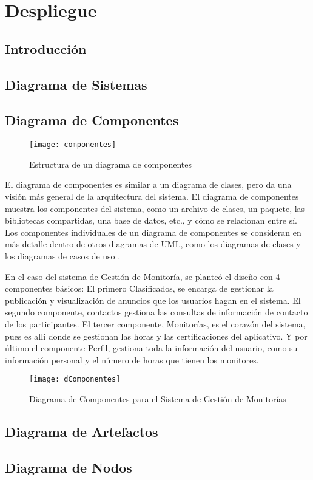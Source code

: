 \chapter{Despliegue}

\section{Introducción}

\newpage

\section{Diagrama de Sistemas}

\newpage

\section{Diagrama de Componentes}
\begin{figure}[H]
	\centering
	\texttt{[image: componentes]}
	\centering
	\caption{Estructura de un diagrama de componentes}
	\label{fig:componentes}
\end{figure}

El diagrama de componentes es similar a un diagrama de clases, pero da una visión más
general de la arquitectura del sistema. El diagrama de componentes muestra los componentes
del sistema, como un archivo de clases, un paquete, las bibliotecas compartidas, una base
de datos, etc., y cómo se relacionan entre sí. Los componentes individuales de un diagrama de
componentes se consideran en más detalle dentro de otros diagramas de UML, como los
diagramas de clases y los diagramas de casos de uso \cite{Kendall_2005}.

En el caso del sistema de Gestión de Monitoría, se planteó el diseño con 4 componentes básicos: El primero Clasificados, se encarga de gestionar la publicación y visualización de anuncios que los usuarios hagan en el sistema. El segundo componente, contactos gestiona las consultas de información de contacto de los participantes. El tercer componente, Monitorías, es el corazón del sistema, pues es allí donde se gestionan las horas y las certificaciones del aplicativo. Y por último el componente Perfil, gestiona toda la información del usuario, como su información personal y el número de horas que tienen los monitores.

\begin{figure}[H]
	\centering
	\texttt{[image: dComponentes]}
	\centering
	\caption{Diagrama de Componentes para el Sistema de Gestión de Monitorías}
	\label{fig:dcomponentes}
\end{figure}
\newpage

\section{Diagrama de Artefactos}

\newpage

\section{Diagrama de Nodos}

\newpage

